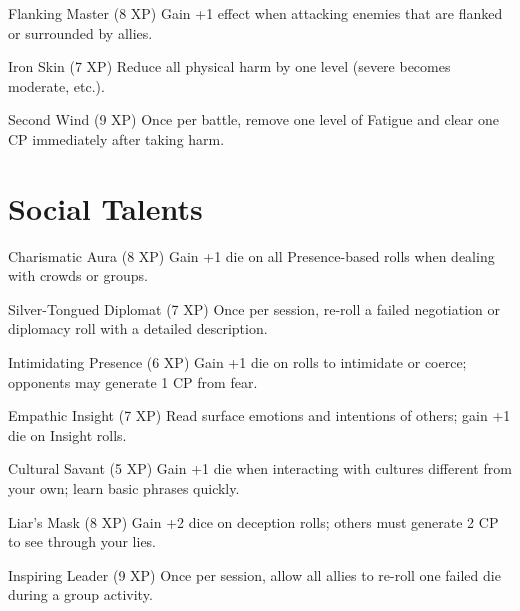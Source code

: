 \documentclass[11pt]{article}
\begin{document}
\begin{talentbox}{Flanking Master (8 XP)}
Gain +1 effect when attacking enemies that are flanked or surrounded by allies.
\end{talentbox}

\begin{talentbox}{Iron Skin (7 XP)}
Reduce all physical harm by one level (severe becomes moderate, etc.).
\end{talentbox}

\begin{talentbox}{Second Wind (9 XP)}
Once per battle, remove one level of Fatigue and clear one CP immediately after taking harm.
\end{talentbox}

\section*{Social Talents}

\begin{talentbox}{Charismatic Aura (8 XP)}
Gain +1 die on all Presence-based rolls when dealing with crowds or groups.
\end{talentbox}

\begin{talentbox}{Silver-Tongued Diplomat (7 XP)}
Once per session, re-roll a failed negotiation or diplomacy roll with a detailed description.
\end{talentbox}

\begin{talentbox}{Intimidating Presence (6 XP)}
Gain +1 die on rolls to intimidate or coerce; opponents may generate 1 CP from fear.
\end{talentbox}

\begin{talentbox}{Empathic Insight (7 XP)}
Read surface emotions and intentions of others; gain +1 die on Insight rolls.
\end{talentbox}

\begin{talentbox}{Cultural Savant (5 XP)}
Gain +1 die when interacting with cultures different from your own; learn basic phrases quickly.
\end{talentbox}

\begin{talentbox}{Liar's Mask (8 XP)}
Gain +2 dice on deception rolls; others must generate 2 CP to see through your lies.
\end{talentbox}

\begin{talentbox}{Inspiring Leader (9 XP)}
Once per session, allow all allies to re-roll one failed die during a group activity.
\end{talentbox}
\end{document}
